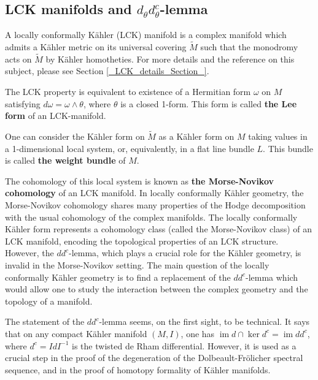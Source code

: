 \documentclass[11pt]{article}
\numberwithin{equation}{section}
\newcommand{\6}{\partial}
\renewcommand{\tilde}{\widetilde}
\newcommand{\im}{\operatorname{im}}
\newcounter{lemma}[section]
\newcounter{question}[section]
\begin{document}

\subsection{LCK manifolds and $d_\theta d_\theta^c$-lemma}


A locally conformally K\"ahler (LCK) manifold is a 
complex manifold which admits a K\"ahler metric 
on its universal covering $\tilde M$ such that the monodromy
acts on $\tilde M$ by K\"ahler homotheties. For more
details and the reference on this subject, please see
Section \ref{_LCK_details_Section_}. 

The LCK property is equivalent to existence
of a Hermitian form $\omega$ on $M$ satisfying
$d\omega=\omega\wedge \theta$, where $\theta$
is a closed 1-form. This form is called
{\bf the Lee form} of an LCK-manifold.


One can consider
the K\"ahler form on $\tilde M$ as a K\"ahler form on
$M$ taking values in a 1-dimensional local system,
or, equivalently, in a flat line bundle $L$. This bundle
is called {\bf the weight bundle} of $M$.

The cohomology of this local system is known as 
{\bf the Morse-Novikov cohomology} of an LCK manifold.
In locally conformally K\"ahler geometry, the 
Morse-Novikov cohomology shares many properties 
of the Hodge decomposition with
the usual cohomology of the complex manifolds.
The locally conformally K\"ahler form represents
a cohomology class (called the Morse-Novikov class)
of an LCK manifold, encoding the topological
properties of an LCK structure. However, the 
$dd^c$-lemma, which plays a crucial role 
for the K\"ahler geometry, is invalid in 
the Morse-Novikov setting. The main question 
of the locally conformally K\"ahler geometry
is to find a replacement of the $dd^c$-lemma
which would allow one to study the interaction
between the complex geometry and the topology of a manifold.

The statement of the $dd^c$-lemma seems,
on the first sight, to be technical.
It says that on any compact K\"ahler manifold
$(M,I)$, one has $\im d \cap \ker d^c = \im dd^c$,
where $d^c=IdI^{-1}$ is the twisted de Rham differential.
However, it is used as a crucial step in the proof
of the degeneration of the Dolbeault-Fr\"olicher
spectral sequence, and in the proof of 
homotopy formality of K\"ahler manifolds.
\end{document}
